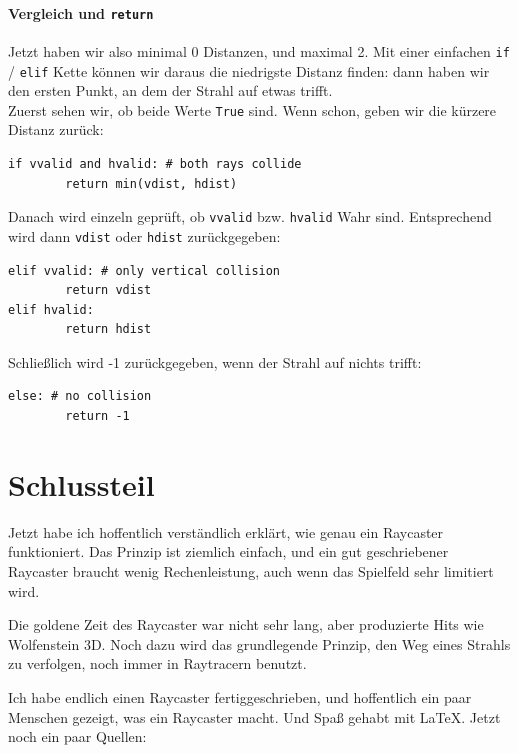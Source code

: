 \documentclass[a4paper,12pt]{report}
\newcommand{\mychapter}[2]{
    \setcounter{chapter}{#1}
    \setcounter{section}{0}
    \chapter*{#2}
    \addcontentsline{toc}{chapter}{#2}
}
\begin{document}
\subsubsection{Vergleich und \texttt{return}}
Jetzt haben wir also minimal 0 Distanzen, und maximal 2. Mit einer einfachen \texttt{if} / \texttt{elif} Kette können wir daraus die niedrigste Distanz finden: dann haben wir den ersten Punkt, an dem der Strahl auf etwas trifft. \\
Zuerst sehen wir, ob beide Werte \texttt{True} sind. Wenn schon, geben wir die kürzere Distanz zurück:
\begin{Verbatim}[baselinestretch=1.0, xleftmargin=1cm]
if vvalid and hvalid: # both rays collide
        return min(vdist, hdist)
\end{Verbatim}
Danach wird einzeln geprüft, ob \texttt{vvalid} bzw. \texttt{hvalid} Wahr sind. Entsprechend wird dann \texttt{vdist} oder \texttt{hdist} zurückgegeben:
\begin{Verbatim}[baselinestretch=1.0, xleftmargin=1cm]
elif vvalid: # only vertical collision
        return vdist
elif hvalid:
        return hdist
\end{Verbatim}
Schließlich wird -1 zurückgegeben, wenn der Strahl auf nichts trifft:
\begin{Verbatim}[baselinestretch=1.0, xleftmargin=1cm]
else: # no collision
        return -1
\end{Verbatim}

\begingroup
\renewcommand{\cleardoublepage}{}
\renewcommand{\clearpage}{}

\mychapter{3}{Schlussteil}
Jetzt habe ich hoffentlich verständlich erklärt, wie genau ein Raycaster funktioniert. Das Prinzip ist ziemlich einfach, und ein gut geschriebener Raycaster braucht wenig Rechenleistung, auch wenn das Spielfeld sehr limitiert wird.

Die goldene Zeit des Raycaster war nicht sehr lang, aber produzierte Hits wie Wolfenstein 3D. Noch dazu wird das grundlegende Prinzip, den Weg eines Strahls zu verfolgen, noch immer in Raytracern benutzt.

Ich habe endlich einen Raycaster fertiggeschrieben, und hoffentlich ein paar Menschen gezeigt, was ein Raycaster macht. Und Spaß gehabt mit \LaTeX. Jetzt noch ein paar Quellen:
\endgroup
\end{document}
